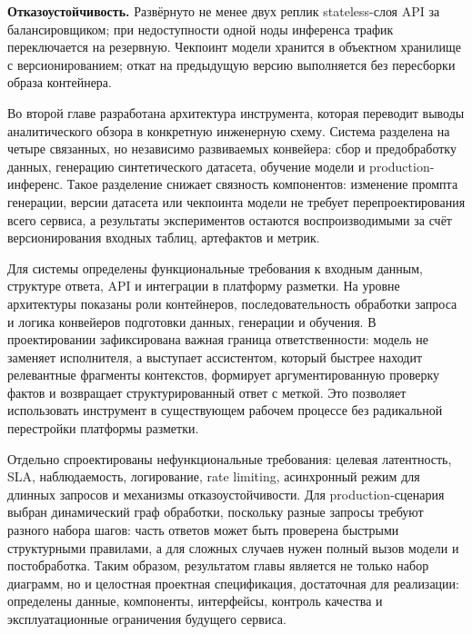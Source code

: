 \documentclass[times]{itmo-student-thesis}
\begin{document}
\textbf{Отказоустойчивость.} Развёрнуто не менее двух реплик
stateless-слоя API за балансировщиком; при недоступности одной ноды
инференса трафик переключается на резервную. Чекпоинт модели хранится
в объектном хранилище с версионированием; откат на предыдущую версию
выполняется без пересборки образа контейнера.

\chapterconclusion

Во второй главе разработана архитектура инструмента, которая переводит
выводы аналитического обзора в конкретную инженерную схему. Система
разделена на четыре связанных, но независимо развиваемых конвейера:
сбор и предобработку данных, генерацию синтетического датасета, обучение
модели и production-инференс. Такое разделение снижает связность компонентов:
изменение промпта генерации, версии датасета или чекпоинта модели не требует
перепроектирования всего сервиса, а результаты экспериментов остаются
воспроизводимыми за счёт версионирования входных таблиц, артефактов и
метрик.

Для системы определены функциональные требования к входным данным,
структуре ответа, API и интеграции в платформу разметки. На уровне
архитектуры показаны роли контейнеров, последовательность обработки запроса
и логика конвейеров подготовки данных, генерации и обучения. В проектировании
зафиксирована важная граница ответственности: модель не заменяет исполнителя,
а выступает ассистентом, который быстрее находит релевантные фрагменты
контекстов, формирует аргументированную проверку фактов и возвращает
структурированный ответ с меткой. Это позволяет использовать инструмент
в существующем рабочем процессе без радикальной перестройки платформы
разметки.

Отдельно спроектированы нефункциональные требования: целевая латентность,
SLA, наблюдаемость, логирование, rate limiting, асинхронный режим для
длинных запросов и механизмы отказоустойчивости. Для production-сценария
выбран динамический граф обработки, поскольку разные запросы требуют
разного набора шагов: часть ответов может быть проверена быстрыми
структурными правилами, а для сложных случаев нужен полный вызов модели
и постобработка. Таким образом, результатом главы является не только
набор диаграмм, но и целостная проектная спецификация, достаточная для
реализации: определены данные, компоненты, интерфейсы, контроль качества
и эксплуатационные ограничения будущего сервиса.

\end{document}
